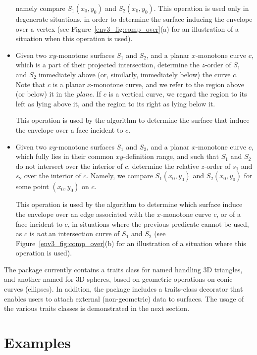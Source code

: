 \begin{itemize}
namely compare $S_1(x_0,y_0)$ and $S_2(x_0,y_0)$.
%
This operation is used only in degenerate situations, in order to
determine the surface inducing the envelope over a vertex (see
Figure~\ref{env3_fig:comp_over}(a) for an illustration of a situation
when this operation is used).
%
\item Given two $xy$-monotone surfaces $S_1$ and $S_2$, and a
planar $x$-monotone curve $c$, which is a part of their projected
intersection, determine the $z$-order of $S_1$ and $S_2$ immediately
above (or, similarly, immediately below) the curve $c$. Note that $c$
is a planar $x$-monotone curve, and we refer to the region above
(or below) it in the {\it plane}. If $c$ is a vertical curve, we regard
the region to its left as lying above it, and the region to its right
as lying below it.

This operation is used by the algorithm to determine the surface that
induce the envelope over a face incident to $c$.
%
\item Given two $xy$-monotone surfaces $S_1$ and $S_2$, and a
planar $x$-monotone curve $c$, which fully lies in their common
$xy$-definition range, and such that $S_1$ and $S_2$ do not intersect
over the interior of $c$, determine the relative $z$-order of $s_1$
and $s_2$ over the interior of $c$. Namely, we compare $S_1(x_0,y_0)$
and $S_2(x_0,y_0)$ for some point $(x_0, y_0)$ on $c$.

This operation is used by the algorithm to determine which surface
induce the envelope over an edge associated with the $x$-monotone
curve $c$, or of a face incident to $c$, in situations where the
previous predicate cannot be used, as $c$ is {\em not} an intersection
curve of $S_1$ and $S_2$ (see Figure~\ref{env3_fig:comp_over}(b) for
an illustration of a situation where this operation is used).
\end{itemize}

The package currently contains a traits class for named
 handling 3D triangles, and another
named  for 3D spheres, based
on geometric operations on conic curves (ellipses). In addition, the
package includes a traits-class decorator that enables users to attach
external (non-geometric) data to surfaces. The usage of the various
traits classes is demonstrated in the next section.

\section{Examples}

